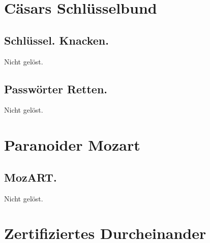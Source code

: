 \documentclass[12pt, a4paper, titlepage, oneside]{scrartcl}
\begin{document}
	\section{C\"asars Schl\"usselbund}

	\subsection{Schl\"ussel. Knacken.}
	Nicht gelöst.

	\subsection{Passw\"orter Retten.}
	Nicht gelöst.

	\section{Paranoider Mozart}

	\subsection{MozART.}
	Nicht gelöst.

	\newpage

	\section{Zertifiziertes Durcheinander}
\end{document}
